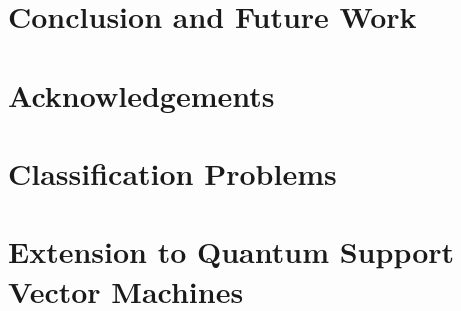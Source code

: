 \documentclass[
    paper=a4, 
    lang=en, 
    font=kpfonts,
    ptsize=12pt,
    titles=bf,
    hanging-titles=true,
    cleanlook, printdayoff, %
    draft %
]
{skrapport}
\begin{document}
    \section{Conclusion and Future Work}
        \label{sec:future}
        

    \section*{Acknowledgements}
        \label{sec:ack}
        

    \printbibliography

    \pagebreak
    \appendix

    \section{Classification Problems}
    \label{app:classification}
    

    \section{Extension to Quantum Support Vector Machines}
    \label{app:qsvm}
    
\end{document}
